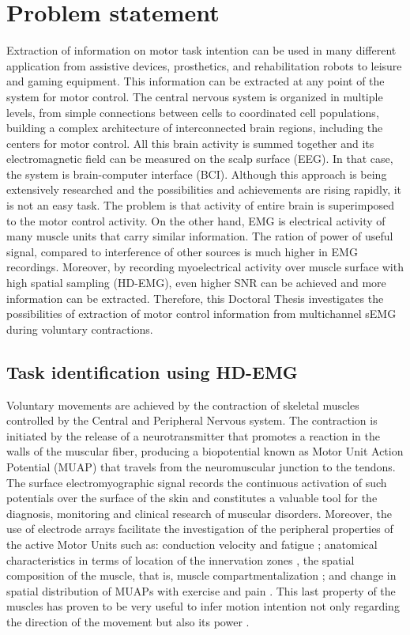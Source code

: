 \chapter{Problem statement}

Extraction of information on motor task intention can be used in many different application from assistive devices, prosthetics, and rehabilitation robots to leisure and gaming equipment. This information can be extracted at any point of the system for motor control. The central nervous system is organized in multiple levels, from simple connections between cells to coordinated cell populations, building a complex architecture of interconnected brain regions, including the centers for motor control. All this brain activity is summed together and its electromagnetic field can be measured on the scalp surface (EEG). In that case, the system is brain-computer interface (BCI). Although this approach is being extensively researched and the possibilities and achievements are rising rapidly, it is not an easy task. The problem is that activity of entire brain is superimposed to the motor control activity.
On the other hand, EMG is electrical activity of many muscle units that carry similar information. The ration of power of useful signal, compared to interference of other sources is much higher in EMG recordings. Moreover, by recording myoelectrical activity over muscle surface with high spatial sampling (HD-EMG), even higher SNR can be achieved and more information can be extracted. Therefore, this Doctoral Thesis investigates the possibilities of extraction of motor control information from multichannel sEMG during voluntary contractions.

    
    
    \section{Task identification using HD-EMG}
    
    Voluntary movements are achieved by the contraction of skeletal muscles controlled by the Central and Peripheral Nervous system. The contraction is initiated by the release of a neurotransmitter that promotes a reaction in the walls of the muscular fiber, producing a biopotential known as Motor Unit Action Potential (MUAP) that travels from the neuromuscular junction to the tendons. The surface electromyographic signal records the continuous activation of such potentials over the surface of the skin and constitutes a valuable tool for the diagnosis, monitoring and clinical research of muscular disorders. Moreover, the use of electrode arrays facilitate the investigation of the peripheral properties of the active Motor Units such as: conduction velocity and fatigue \citep{Soares2015}; anatomical characteristics in terms of location of the innervation zones \citep{Beck2012}, the spatial composition of the muscle, that is, muscle compartmentalization \citep{Vieira2010}; and change in spatial distribution of MUAPs with exercise and pain \citep{Madeleine2006}. This last property of the muscles has proven to be very useful to infer motion intention not only regarding the direction of the movement but also its power \citep{Rojas-Martinez2013}.
    
